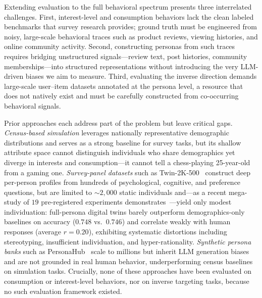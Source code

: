 Extending evaluation to the full behavioral spectrum presents three interrelated challenges.
First, interest-level and consumption behaviors lack the clean labeled benchmarks that survey research provides; ground truth must be engineered from noisy, large-scale behavioral traces such as product reviews, viewing histories, and online community activity.
Second, constructing personas from such traces requires bridging unstructured signals---review text, post histories, community memberships---into structured representations without introducing the very LLM-driven biases we aim to measure.
Third, evaluating the inverse direction demands large-scale user--item datasets annotated at the persona level, a resource that does not natively exist and must be carefully constructed from co-occurring behavioral signals.

Prior approaches each address part of the problem but leave critical gaps.
\emph{Census-based simulation} leverages nationally representative demographic distributions and serves as a strong baseline for survey tasks, but its shallow attribute space cannot distinguish individuals who share demographics yet diverge in interests and consumption---it cannot tell a chess-playing 25-year-old from a gaming one.
\emph{Survey-panel datasets} such as Twin-2K-500~\cite{twin2k500} construct deep per-person profiles from hundreds of psychological, cognitive, and preference questions, but are limited to ${\sim}2{,}000$ static individuals and---as a recent mega-study of $19$ pre-registered experiments demonstrates~\cite{funhouse}---yield only modest individuation: full-persona digital twins barely outperform demographics-only baselines on accuracy ($0.748$ vs.\ $0.746$) and correlate weakly with human responses (average $r = 0.20$), exhibiting systematic distortions including stereotyping, insufficient individuation, and hyper-rationality.
\emph{Synthetic persona banks} such as PersonaHub~\cite{personahub} scale to millions but inherit LLM generation biases and are not grounded in real human behavior, underperforming census baselines on simulation tasks.
Crucially, none of these approaches have been evaluated on consumption or interest-level behaviors, nor on inverse targeting tasks, because no such evaluation framework existed.

